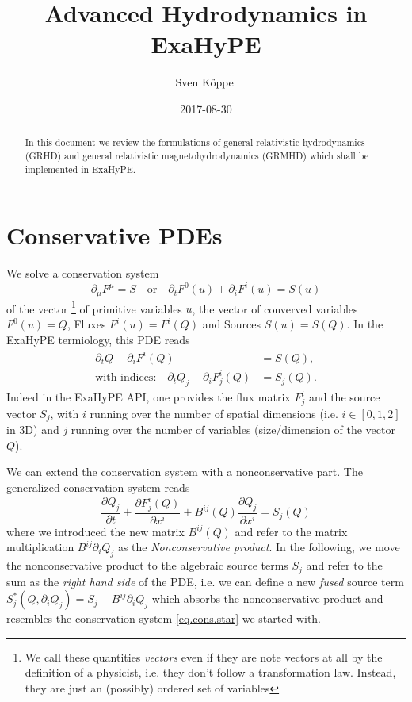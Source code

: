 \documentclass[a4paper]{article}
\title{Advanced Hydrodynamics in ExaHyPE}
\author{Sven Köppel}
\date{2017-08-30}
\newcommand{\pp}[2]{\frac{\partial #1}{\partial #2}}
\begin{document}
\maketitle

\begin{abstract}
In this document we review the formulations of general
relativistic hydrodynamics (GRHD) and general relativistic
magnetohydrodynamics (GRMHD) which shall be implemented in
ExaHyPE.
\end{abstract}

\tableofcontents

\section{Conservative PDEs}

We solve a conservation system
\begin{equation}\label{eq.cons.star}
\partial_\mu F^\mu=S
\quad\text{or}\quad
\partial_t F^0(u) + \partial_i F^i(u) = S(u)
\end{equation}
of the vector%
\footnote{We call these quantities \emph{vectors} even if they
are note vectors at all by the definition of a physicist, i.e.
they don't follow a transformation law. Instead, they are just
an (possibly) ordered set of variables}
of primitive variables $u$, the vector of converved variables
$F^0(u)=Q$, Fluxes $F^i(u)=F^i(Q)$ and Sources $S(u)=S(Q)$. In the
ExaHyPE termiology, this PDE reads
\begin{align}
\partial_t Q + \partial_i F^i(Q) &= S(Q), \\
\text{with indices:}\quad
\partial_t Q_j + \partial_i F^i_j(Q) &= S_j(Q).
\end{align}
Indeed in the ExaHyPE API, one provides the flux matrix
$F^i_j$ and the source vector $S_j$, with $i$ running over the
number of spatial dimensions (i.e. $i\in[0,1,2]$ in 3D) and $j$
running over the number of variables (size/dimension of the vector $Q$).

We can extend the conservation system with a nonconservative part.
The generalized conservation system reads
\begin{equation}
\pp {Q_j}t + \pp {F^i_j(Q)}{x^i} + B^{ij}(Q) \pp {Q_j}{x^i} = S_j(Q)
\end{equation}
where we introduced the new matrix $B^{ij}(Q)$ and refer to the
matrix multiplication $B^{ij}\partial_i Q_j$ as the
\emph{Nonconservative product}. In the following, we move the
nonconservative product to the algebraic source terms $S_j$
and refer to the sum as the \emph{right hand side} of the PDE,
i.e. we can define a new \emph{fused} source term
$S^*_j(Q, \partial_i Q_j)=S_j - B^{ij}\partial_i Q_j$
which absorbs the nonconservative product and resembles the
conservation system \eqref{eq.cons.star} we started with.
\end{document}
